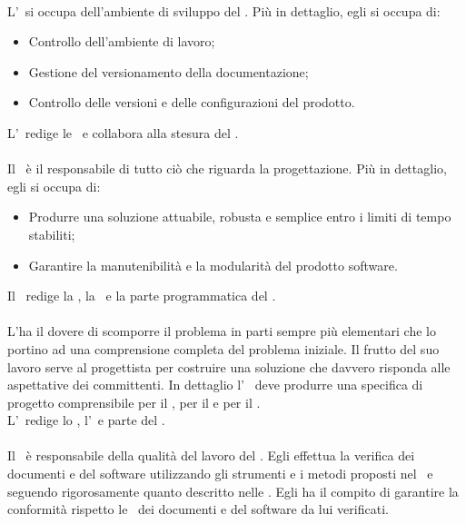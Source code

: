 \paragraph{\Am}
L'\Am\ si occupa dell'ambiente di sviluppo del . Più in dettaglio, egli si occupa di:
\begin{itemize}
  \item Controllo dell'ambiente di lavoro;
  \item Gestione del versionamento della documentazione;
  \item Controllo delle versioni e delle configurazioni del prodotto.
\end{itemize}
L'\Am\ redige le \NdP\ e collabora alla stesura del
\PdP.

\paragraph{\Prog} 
Il \Prog\ è il responsabile di tutto ciò che riguarda la progettazione.
Più in dettaglio, egli si occupa di:
\begin{itemize}
  \item Produrre una soluzione attuabile, robusta e semplice entro i limiti di
  tempo stabiliti;
  \item Garantire la manutenibilità e la modularità del prodotto software.
\end{itemize}
Il \Prog\ redige la \ST, la \DDP\ e la parte
programmatica del \PdQ.

\paragraph{\An}
L'\An ha il dovere di scomporre il problema in parti sempre più elementari che lo portino ad una comprensione completa del problema iniziale.
Il frutto del suo lavoro serve al progettista per costruire una soluzione che davvero risponda alle aspettative dei committenti.
In dettaglio l' \An\ deve produrre una specifica di progetto comprensibile per il , per il  e per il \Prog. \\
L'\An\ redige lo \SdF, l'\AdR\ e parte del \PdQ.

\paragraph{\Ver}
Il \Ver\ è responsabile della qualità del lavoro del .
Egli effettua la verifica dei documenti e del software utilizzando gli strumenti e i metodi proposti nel
\PdQ\ e seguendo rigorosamente quanto descritto nelle \NdP.
Egli ha il compito di garantire la conformità rispetto le \NdP\ dei documenti e del software da lui verificati.

